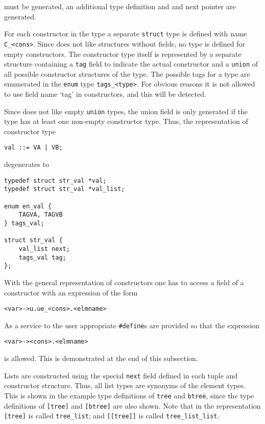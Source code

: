 must be generated, an additional type definition and and next pointer
are generated.
\par
For each constructor in the type a separate {\tt struct} type is defined
with name {\tt C\_<cons>}.
Since {\C} does not like structures without fields,
no type is defined for empty constructors.
The constructor type itself is represented by a separate structure containing
a {\tt tag} field to indicate the actual constructor
and a {\tt union} of all possible constructor structures of the type.
The possible tags for a type are enumerated in the {\tt enum} type
{\tt tags\_<type>}.
For obvious reasons it is not allowed to use field name `tag' in constructors,
and this will be detected.
\par
Since {\C} does not like empty {\tt union} types,
the union field is only generated if the type has at least
one non-empty constructor type.
Thus,
the representation of constructor type
\begin{verbatim}
val ::= VA | VB;
\end{verbatim}
degenerates to
\begin{verbatim}
typedef struct str_val *val;
typedef struct str_val *val_list;

enum en_val {
    TAGVA, TAGVB
} tags_val;

struct str_val {
    val_list next;
    tags_val tag;
};
\end{verbatim}
\par
With the general representation of constructors
one has to access a field of a constructor with an
expression of the form
\begin{verbatim}
<var>->u.ue_<cons>.<elmname>
\end{verbatim}
As a service to the user appropriate {\tt \#define}s are provided
so that the expression
\begin{verbatim}
<var>-><cons>.<elmname>
\end{verbatim}
is allowed.
This is demonstrated at the end of this subsection.
\par
{}
Lists are constructed using the special {\tt next} field defined
in each tuple and constructor structure.
Thus, all list types are synonyms of the element types.
This is shown in the example type definitions of {\tt tree} and
{\tt btree}, since the type definitions of \verb+[tree]+ and
\verb+[btree]+ are also shown.
Note that in the {\C} representation \verb+[tree]+ is called
\verb+tree_list+; and \verb+[[tree]]+ is called \verb+tree_list_list+.
